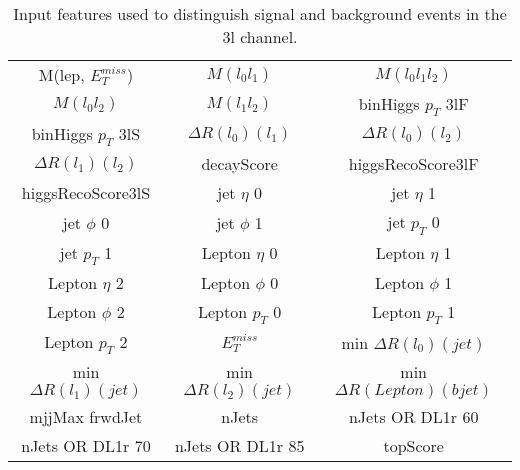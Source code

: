 \begin{table}[H]
  \begin{center}
  \begin{tabular}{ccc}
    \hline\hline
    M(lep, $E_T^{miss}$) & $M(l_0l_1)$ & $M(l_0l_1l_2)$ \\
    $M(l_0l_2)$ & $M(l_1l_2)$ & binHiggs $p_T$ 3lF \\
    binHiggs $p_T$ 3lS & $\Delta R(l_0)(l_1)$ & $\Delta R(l_0)(l_2)$ \\
    $\Delta R(l_1)(l_2)$ & decayScore & higgsRecoScore3lF \\
    higgsRecoScore3lS & jet  $\eta$ 0 & jet  $\eta$ 1 \\
    jet $\phi$ 0 & jet $\phi$ 1 & jet  $p_T$ 0 \\
    jet  $p_T$ 1 & Lepton  $\eta$ 0 & Lepton  $\eta$ 1 \\
    Lepton  $\eta$ 2 & Lepton $\phi$ 0 & Lepton $\phi$ 1 \\
    Lepton $\phi$ 2 & Lepton  $p_T$ 0 & Lepton  $p_T$ 1 \\
    Lepton  $p_T$ 2 & $E_T^{miss}$ & min $\Delta R(l_0)(jet)$ \\
    min $\Delta R(l_1)(jet)$ & min $\Delta R(l_2)(jet)$ & min $\Delta R(Lepton)(bjet)$ \\
    mjjMax frwdJet & nJets & nJets OR DL1r 60 \\
    nJets OR DL1r 70 & nJets OR DL1r 85 & topScore   \\
    \hline
  \end{tabular}
  \end{center}
  \caption{Input features used to distinguish signal and background events in the 3l channel.}
  \label{tab:sigBkg3lfeatures}
\end{table}
